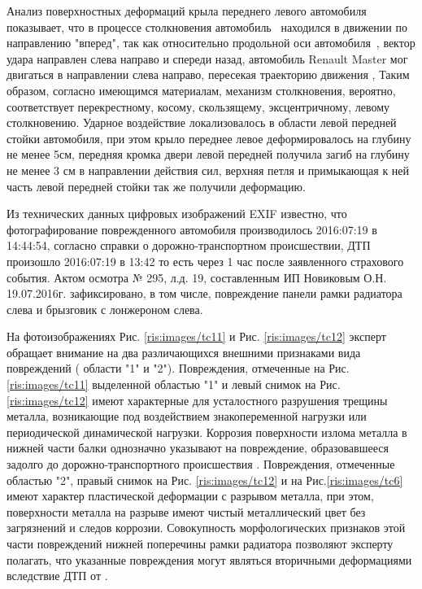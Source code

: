 Анализ поверхностных  деформаций крыла переднего левого  автомобиля \, показывает, что в процессе столкновения  автомобиль \, находился в движении по направлению "вперед", так как  относительно продольной оси автомобиля \,, вектор удара направлен слева направо и спереди назад, автомобиль Renault Master мог двигаться в направлении слева направо, пересекая траекторию движения , Таким образом, согласно имеющимся материалам, механизм столкновения,    вероятно, соответствует перекрестному, косому, скользящему, эксцентричному, левому столкновению.  Ударное воздействие локализовалось в области левой передней стойки автомобиля, при этом крыло переднее левое деформировалось на глубину не менее 5см, передняя  кромка двери левой передней получила загиб на глубину не менее 3 см в направлении действия сил, верхняя петля и примыкающая к ней часть левой передней стойки так же получили деформацию.  

Из технических данных  цифровых изображений EXIF известно, что 
фотографирование поврежденного автомобиля производилось  2016:07:19 в 14:44:54,  согласно справки о дорожно-транспортном происшествии, ДТП произошло 2016:07:19 в 13:42 то есть через 1 час после заявленного страхового события. Актом осмотра № 295, л.д. 19, составленным ИП Новиковым О.Н. 19.07.2016г. зафиксировано, в том числе, повреждение панели рамки радиатора слева и брызговик с лонжероном  слева.

На фотоизображениях Рис. \ref{ris:images/tc11} и Рис. \ref{ris:images/tc12} эксперт обращает внимание на два различающихся внешними признаками  вида повреждений ( области "1" и "2"). Повреждения, отмеченные на Рис. \ref{ris:images/tc11} выделенной областью "1" и левый снимок на Рис. \ref{ris:images/tc12} имеют характерные для усталостного разрушения трещины металла, возникающие под воздействием знакопеременной нагрузки или периодической динамической нагрузки. Коррозия поверхности излома металла в нижней части балки однозначно указывают на повреждение, образовавшееся задолго до дорожно-транспортного происшествия .  Повреждения, отмеченные областью "2", правый снимок на Рис.  \ref{ris:images/tc12} и на Рис.\ref{ris:images/tc6}  имеют характер пластической деформации с разрывом металла, при этом, поверхности металла на разрыве имеют чистый металлический цвет без загрязнений и следов коррозии. Совокупность морфологических признаков этой части повреждений нижней поперечины рамки радиатора позволяют эксперту полагать, что указанные повреждения могут являться вторичными деформациями вследствие ДТП от .

